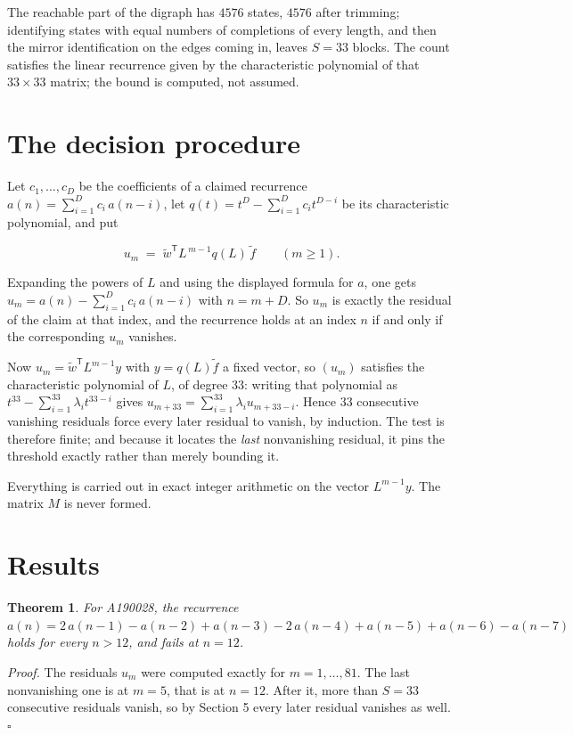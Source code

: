 \documentclass[11pt]{article}
\newtheorem{theorem}{Theorem}
\theoremstyle{definition}
\begin{document}
The reachable part of the digraph has $4576$ states, $4576$ after trimming; identifying states with equal numbers of completions of every length, and then the mirror identification on the edges coming in, leaves $S = 33$ blocks. The count satisfies the linear recurrence given by the characteristic polynomial of that $33\times33$ matrix; the bound is computed, not assumed.

\section{The decision procedure}

Let $c_1,\dots,c_D$ be the coefficients of a claimed recurrence $a(n) = \sum_{i=1}^{D} c_i\,a(n-i)$, let $q(t) = t^{D} - \sum_{i=1}^{D} c_i t^{D-i}$ be its characteristic polynomial, and put

\[u_m \;=\; \tilde w^{\mathsf T} L^{\,m-1} q(L)\,\tilde f \qquad (m \ge 1).\]

Expanding the powers of $L$ and using the displayed formula for $a$, one gets $u_m = a(n) - \sum_{i=1}^{D} c_i\,a(n-i)$ with $n = m + D$. So $u_m$ is exactly the residual of the claim at that index, and the recurrence holds at an index $n$ if and only if the corresponding $u_m$ vanishes.

Now $u_m = \tilde w^{\mathsf T} L^{m-1} y$ with $y = q(L)\tilde f$ a fixed vector, so $(u_m)$ satisfies the characteristic polynomial of $L$, of degree $33$: writing that polynomial as $t^{33} - \sum_{i=1}^{33} \lambda_i t^{33-i}$ gives $u_{m+33} = \sum_{i=1}^{33} \lambda_i u_{m+33-i}$. Hence $33$ consecutive vanishing residuals force every later residual to vanish, by induction. The test is therefore finite; and because it locates the {\itshape last} nonvanishing residual, it pins the threshold exactly rather than merely bounding it.

Everything is carried out in exact integer arithmetic on the vector $L^{m-1}y$. The matrix $M$ is never formed.

\section{Results}

\begin{theorem} For A190028, the recurrence $a(n) = 2\,a(n-1) - a(n-2) + a(n-3) - 2\,a(n-4) + a(n-5) + a(n-6) - a(n-7)$ holds for every $n > 12$, and fails at $n = 12$.\end{theorem}

{\itshape Proof.} The residuals $u_m$ were computed exactly for $m = 1,\dots,81$. The last nonvanishing one is at $m = 5$, that is at $n = 12$. After it, more than $S = 33$ consecutive residuals vanish, so by Section 5 every later residual vanishes as well. $\square$
\end{document}
